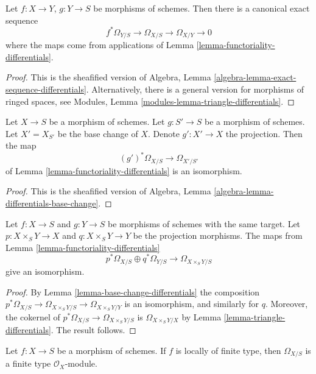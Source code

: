 \begin{lemma}
\label{lemma-triangle-differentials}
Let $f : X \to Y$, $g : Y \to S$ be morphisms of schemes.
Then there is a canonical exact sequence
$$
f^*\Omega_{Y/S} \to \Omega_{X/S} \to \Omega_{X/Y} \to 0
$$
where the maps come from applications of
Lemma \ref{lemma-functoriality-differentials}.
\end{lemma}

\begin{proof}
This is the sheafified version of
Algebra, Lemma \ref{algebra-lemma-exact-sequence-differentials}.
Alternatively, there is a general version for morphisms of ringed
spaces, see Modules, Lemma \ref{modules-lemma-triangle-differentials}.
\end{proof}

\begin{lemma}
\label{lemma-base-change-differentials}
Let $X \to S$ be a morphism of schemes.
Let $g : S' \to S$ be a morphism of schemes.
Let $X' = X_{S'}$ be the base change of $X$.
Denote $g' : X' \to X$ the projection.
Then the map
$$
(g')^*\Omega_{X/S} \to \Omega_{X'/S'}
$$
of Lemma \ref{lemma-functoriality-differentials} is an isomorphism.
\end{lemma}

\begin{proof}
This is the sheafified version of
Algebra, Lemma \ref{algebra-lemma-differentials-base-change}.
\end{proof}

\begin{lemma}
\label{lemma-differential-product}
Let $f : X \to S$ and $g : Y \to S$ be morphisms of schemes with the same
target. Let $p : X \times_S Y \to X$ and $q : X \times_S Y \to Y$ be the
projection morphisms. The maps from
Lemma \ref{lemma-functoriality-differentials}
$$
p^*\Omega_{X/S} \oplus q^*\Omega_{Y/S}
\longrightarrow
\Omega_{X \times_S Y/S}
$$
give an isomorphism.
\end{lemma}

\begin{proof}
By Lemma \ref{lemma-base-change-differentials} the composition
$p^*\Omega_{X/S} \to \Omega_{X \times_S Y/S} \to \Omega_{X \times_S Y/Y}$
is an isomorphism, and similarly for $q$. Moreover, the cokernel
of $p^*\Omega_{X/S} \to \Omega_{X \times_S Y/S}$ is
$\Omega_{X \times_S Y/X}$ by
Lemma \ref{lemma-triangle-differentials}. The result follows.
\end{proof}

\begin{lemma}
\label{lemma-finite-type-differentials}
Let $f : X \to S$ be a morphism of schemes.
If $f$ is locally of finite type, then $\Omega_{X/S}$ is
a finite type $\mathcal{O}_X$-module.
\end{lemma}

